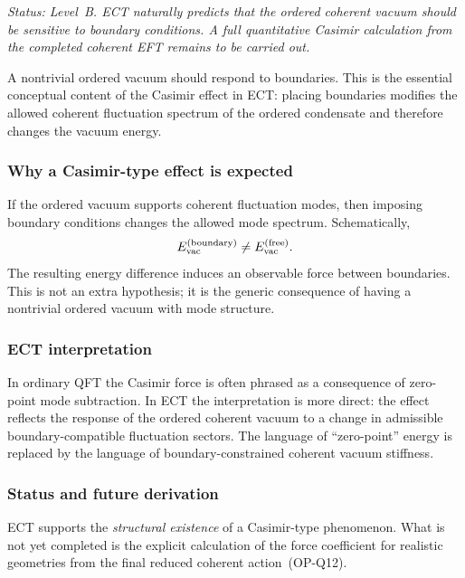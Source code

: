 \documentclass[11pt,a4paper]{article}
\numberwithin{equation}{section}
\begin{document}
\textit{Status: Level~B.
ECT naturally predicts that the ordered coherent vacuum should be
sensitive to boundary conditions.
A full quantitative Casimir calculation from the completed coherent
EFT remains to be carried out.}

\medskip
A nontrivial ordered vacuum should respond to boundaries.
This is the essential conceptual content of the Casimir effect in ECT:
placing boundaries modifies the allowed coherent fluctuation spectrum
of the ordered condensate and therefore changes the vacuum energy.

\subsubsection*{Why a Casimir-type effect is expected}

If the ordered vacuum supports coherent fluctuation modes, then
imposing boundary conditions changes the allowed mode spectrum.
Schematically,
\begin{equation}
  \label{eq:qs_casimir_modes}
  E_{\rm vac}^{\rm(boundary)}
  \neq
  E_{\rm vac}^{\rm(free)}.
\end{equation}
The resulting energy difference induces an observable force between
boundaries.
This is not an extra hypothesis; it is the generic consequence of
having a nontrivial ordered vacuum with mode structure.

\subsubsection*{ECT interpretation}

In ordinary QFT the Casimir force is often phrased as a consequence of
zero-point mode subtraction.
In ECT the interpretation is more direct: the effect reflects the
response of the ordered coherent vacuum to a change in admissible
boundary-compatible fluctuation sectors.
The language of ``zero-point'' energy is replaced by the language of
boundary-constrained coherent vacuum stiffness.

\subsubsection*{Status and future derivation}

ECT supports the \emph{structural existence} of a Casimir-type
phenomenon.
What is not yet completed is the explicit calculation of the force
coefficient for realistic geometries from the final reduced coherent
action~(OP-Q12).
\end{document}
